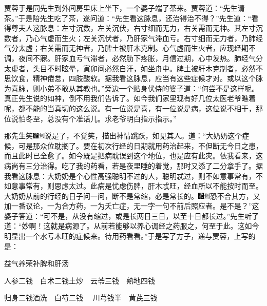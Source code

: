 贾蓉于是同先生到外间房里床上坐下，一个婆子端了茶来。贾蓉道：``先生请茶。''于是陪先生吃了茶，遂问道：``先生看这脉息，还治得治不得？''先生道：``看得尊夫人这脉息：左寸沉数，左关沉伏，右寸细而无力，右关需而无神。其左寸沉数者，乃心气虚而生火；左关沉伏者，乃肝家气滞血亏。右寸细而无力者，乃肺经气分太虚；右关需而无神者，乃脾土被肝木克制。心气虚而生火者，应现经期不调，夜间不寐。肝家血亏气滞者，必然肋下疼胀，月信过期，心中发热。肺经气分太虚者，头目不时眩晕，寅卯间必然自汗，如坐舟中。脾土被肝木克制者，必然不思饮食，精神倦怠，四肢酸软。据我看这脉息，应当有这些症候才对。或以这个脉为喜脉，则小弟不敢从其教也。''旁边一个贴身伏侍的婆子道：``何尝不是这样呢。真正先生说的如神，倒不用我们告诉了。如今我们家里现有好几位太医老爷瞧着呢，都不能的当真切的这么说。有一位说是喜，有一位说是病，这位说不相干，那位说怕冬至，总没有个准话儿。求老爷明白指示指示。''

那先生笑{\includegraphics[width=3mm]{../Images/00006}\includegraphics[width=3mm]{../Images/00011}\footnotesize \kaishu 说是了，不觉笑，描出神情跳跃，如见其人。}道：``大奶奶这个症候，可是那众位耽搁了。要在初次行经的日期就用药治起来，不但断无今日之患，而且此时已全愈了。如今既是把病耽误到这个地位，也是应有此灾。依我看来，这病尚有三分治得。吃了我的药看，若是夜里睡的着觉，那时又添了二分拿手了。据我看这脉息：大奶奶是个心性高强聪明不过的人，聪明忒过，则不如意事常有，不如意事常有，则思虑太过。此病是忧虑伤脾，肝木忒旺，经血所以不能按时而至。大奶奶从前的行经的日子问一问，断不是常缩，必是常长的。{\includegraphics[width=3mm]{../Images/00006}\includegraphics[width=3mm]{../Images/00011}\footnotesize \kaishu 恐不合其方，又加一番议论，一为合方药，一为夭亡症，无一字一句不前后照应者。}是不是？''这婆子答道：``可不是，从没有缩过，或是长两日三日，以至十日都长过。''先生听了道：``妙啊！这就是病源了。从前若能够以养心调经之药服之，何至于此。这如今明显出一个水亏木旺的症候来。待用药看看。''于是写了方子，递与贾蓉，上写的是：

益气养荣补脾和肝汤

人参{二钱}　白术{二钱土炒}　云苓{三钱}　熟地{四钱}

归身{二钱酒洗}　白芍{二钱} 　川芎{钱半}　黄芪{三钱}

